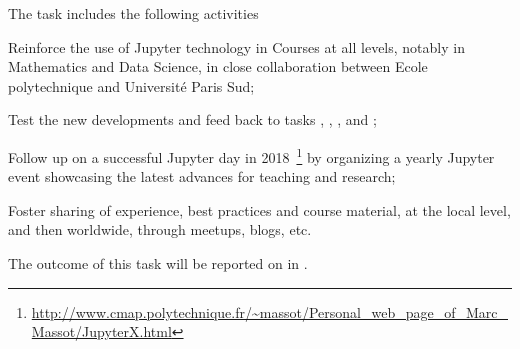 \begin{task}[
  title=Demonstrator: enriched teaching with Jupyter,
  id=teaching,
  lead=EP,
  PM=6, %
  wphases={0-48},
  partners={EGI,UIO,UPSUD,XFEL}
  ]

  The task includes the following activities
  \begin{compactitem}
  \item Reinforce the use of Jupyter technology in Courses at
    all levels, notably in Mathematics and Data Science, in close
    collaboration between Ecole polytechnique and Université Paris Sud;
  \item Test the new developments and feed back to tasks
    , , ,  and ;
  \item Follow up on a successful Jupyter day in
    2018~\footnote{\url{http://www.cmap.polytechnique.fr/~massot/Personal_web_page_of_Marc_Massot/JupyterX.html}}
    by organizing a yearly Jupyter event showcasing the latest
    advances for teaching and research;
  \item Foster sharing of experience, best practices and course
    material, at the local level, and then worldwide, through meetups,
    blogs, etc.
  \end{compactitem}
  The outcome of this task will be reported on in .
\end{task}
